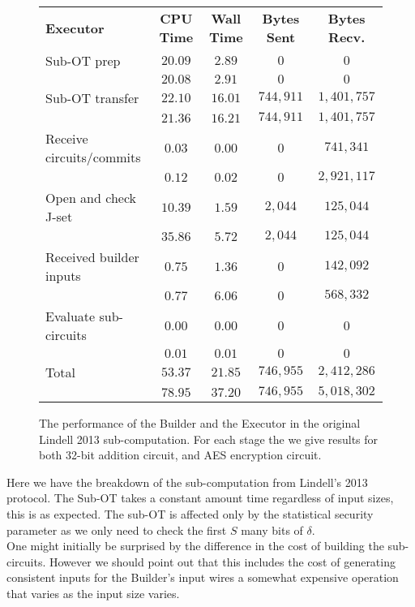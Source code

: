 \documentclass[ %
                    author={Nicholas Tutte},
                supervisor={Prof. Nigel Smart},
                    degree={MEng},
                     title={Secure Two Party Computation},
                  subtitle={A practical comparison of recent protocols},
                      type={Research - GG1K},
                      year={2015} ]{dissertation}
\begin{document}
\begin{figure}[!ht]
						\begin{tabular}{| p{4.3cm} | c c c c |}
							\hline
							\textbf{Executor} & \textbf{CPU Time} & \textbf{Wall Time} & \textbf{Bytes Sent} & \textbf{Bytes Recv.} \\
							\thickhline
							Sub-OT prep & $20.09$ & $2.89$ & $0$ & $0$ \\
								    & $20.08$ & $2.91$ & $0$ & $0$ \\
							\hline
							Sub-OT transfer & $22.10$ & $16.01$ & $744,911$ & $1,401,757$ \\
									& $21.36$ & $16.21$ & $744,911$ & $1,401,757$ \\
							\hline
							Receive circuits/commits & $0.03$ & $0.00$ & $0$ & $741,341$ \\
										 & $0.12$ & $0.02$ & $0$ & $2,921,117$ \\
							\hline
							Open and check J-set & $10.39$ & $1.59$ & $2,044$ & $125,044$ \\
								   & $35.86$ & $5.72$ & $2,044$ & $125,044$ \\
							\hline
							Received builder inputs & $0.75$ & $1.36$ & $0$ & $142,092$ \\
										& $0.77$ & $6.06$ & $0$ & $568,332$ \\
							\hline
							Evaluate sub-circuits & $0.00$ & $0.00$ & $0$ & $0$ \\
									      & $0.01$ & $0.01$ & $0$ & $0$ \\
							\thickhline
							Total & $53.37$ & $21.85$ & $746,955$ & $2,412,286$ \\
							      & $78.95$ & $37.20$ & $746,955$ & $5,018,302$ \\
							\hline
						\end{tabular}
						\caption{The performance of the Builder and the Executor in the original Lindell 2013 sub-computation. For each stage the we give results for both 32-bit addition circuit, and AES encryption circuit. \label{table:L_2013_Sub_Executor} }
					\end{figure}

					\FloatBarrier
					Here we have the breakdown of the sub-computation from Lindell's 2013 protocol. The Sub-OT takes a constant amount time regardless of input sizes, this is as expected. The sub-OT is affected only by the statistical security parameter as we only need to check the first $S$ many bits of $\delta$.\\

					One might initially be surprised by the difference in the cost of building the sub-circuits. However we should point out that this includes the cost of generating consistent inputs for the Builder's input wires a somewhat expensive operation that varies as the input size varies.\\
\end{document}
